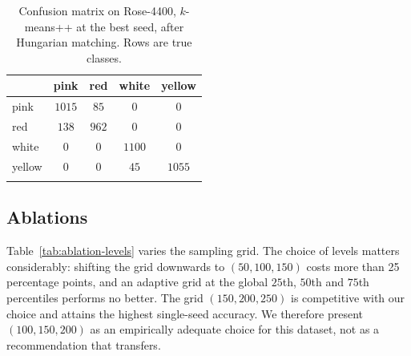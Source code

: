 \documentclass[pdflatex,sn-basic]{sn-jnl}
\theoremstyle{thmstyleone}%
\theoremstyle{thmstyletwo}%
\theoremstyle{thmstylethree}%
\begin{document}
\begin{table}[h]
\centering
\caption{Confusion matrix on Rose-4400, $k$-means++ at the best seed, after
Hungarian matching. Rows are true classes.}\label{tab:confusion-rose}
\begin{tabular}{@{}lcccc@{}}
\toprule
 & pink & red & white & yellow \\
\midrule
pink   & $1015$ & $85$  & $0$    & $0$ \\
red    & $138$  & $962$ & $0$    & $0$ \\
white  & $0$    & $0$   & $1100$ & $0$ \\
yellow & $0$    & $0$   & $45$   & $1055$ \\
\botrule
\end{tabular}
\end{table}

\subsection{Ablations}\label{sec:ablation}


Table~\ref{tab:ablation-levels} varies the sampling grid. The choice of levels
matters considerably: shifting the grid downwards to $(50,100,150)$ costs more
than 25 percentage points, and an adaptive grid at the global $25$th, $50$th
and $75$th percentiles performs no better. The grid $(150,200,250)$ is
competitive with our choice and attains the highest single-seed accuracy. We
therefore present $(100,150,200)$ as an empirically adequate choice for this
dataset, not as a recommendation that transfers.
\end{document}
